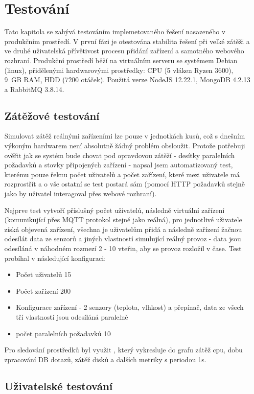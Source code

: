 \chapter{Testování}
Tato kapitola se zabývá testováním implemetovaného řešení nasazeného v produkčním prostředí. V první fázi je otestována stabilita řešení při velké zátěži a ve druhé uživatelská přívětivost procesu přidání zařízení a samotného webového rozhraní. Produkční prostředí běží na virtuálním serveru se systémem Debian (linux), přidělenými hardwarovými prostředky: CPU (5 vláken Ryzen 3600), 9~GB RAM, HDD (7200 otáček). Použitá verze NodeJS 12.22.1, MongoDB 4.2.13 a RabbitMQ 3.8.14.

\section{Zátěžové testování}
Simulovat zátěž reálnými zařízeními lze pouze v jednotkách kusů, což s dnešním výkoným hardwarem není absolutně žádný problém obsloužit. Protože potřebuji ověřit jak se systém bude chovat pod opravdovou zátěží - desítky paralelních požadavků a stovky připojených zařízení - napsal jsem automatizovaný test, kterému pouze řeknu počet uživatelů a počet zařízení, které mezi uživatele má rozprostřít a o vše ostatní se test postará sám (pomocí HTTP požadavků stejně jako by uživatel interagoval přes webové rozhraní).

Nejprve test vytvoří příslušný počet uživatelů, následně virtuální zařízení (komunikující přes MQTT protokol stejně jako reálná), pro jednotlivé uživatele získá objevená zařízení, všechna je uživatelům přidá a následně zařízení žačnou odesílát data ze senzorů a jiných vlastností simulující reálný provoz - data jsou odesíláná v náhodném rozmezí 2 - 10 vteřin, aby se provoz rozložil v čase. Test probíhal v následující konfiguraci:
\begin{itemize}
    \item Počet uživatelů 15
    \item Počet zařízení 200
    \item Konfigurace zařízení - 2 senzory (teplota, vlhkost) a přepínač, data ze všech tří vlastností jsou odesíláná paralelně
    \item počet paralelních požadavků 10
\end{itemize}
Pro sledování prostředků byl využit , který vykresluje do grafu zátěž cpu, dobu zpracování DB dotazů, zátěž disků a dalších metriky s periodou 1s.



\section{Uživatelské testování}